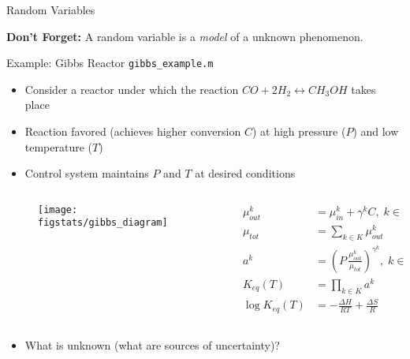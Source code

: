 \documentclass[9pt]{beamer}
\begin{document}
\begin{frame}{Random Variables}
\begin{block}{}
{\bf Don't Forget:} A random variable is a {\em model} of a unknown phenomenon. 
\end{block}
\end{frame}

\begin{frame}{Example: Gibbs Reactor \footnotesize{\texttt{gibbs\_example.m}}}

\begin{itemize}
 \setlength{\itemsep}{5pt}
\item Consider a reactor under which the reaction $CO+2H_2\leftrightarrow CH_3OH$ takes place
\item Reaction favored (achieves higher conversion $C$) at high pressure ($P$) and low temperature ($T$)
\item Control system maintains $P$ and $T$ at desired conditions
\end{itemize}

\begin{columns}
\begin{column}{0.3\textwidth}
\begin{figure}[!htb]
    \centering
	\texttt{[image: figstats/gibbs\_diagram]}
\end{figure}
\end{column}
\begin{column}{0.5\textwidth}
\begin{align*}
\mu_{out}^k&=\mu_{in}^k+\gamma^kC,\;k\in K\\
\mu_{tot}&=\sum_{k\in K}\mu_{out}^k\\
a^k&=\left(P\,\frac{\mu_{out}^k}{\mu_{tot}}\right)^{\gamma^k},\;k\in K\\
K_{eq}(T)&=\prod_{k\in K}a^k\\
\log K_{eq}(T)&=-\frac{\Delta H}{RT}+\frac{\Delta S}{R}
\end{align*}
\end{column}

\end{columns}


\begin{block}{}
\begin{itemize}
\item What is unknown (what are sources of uncertainty)?
\end{itemize}
\end{block}
\end{frame}
\end{document}
